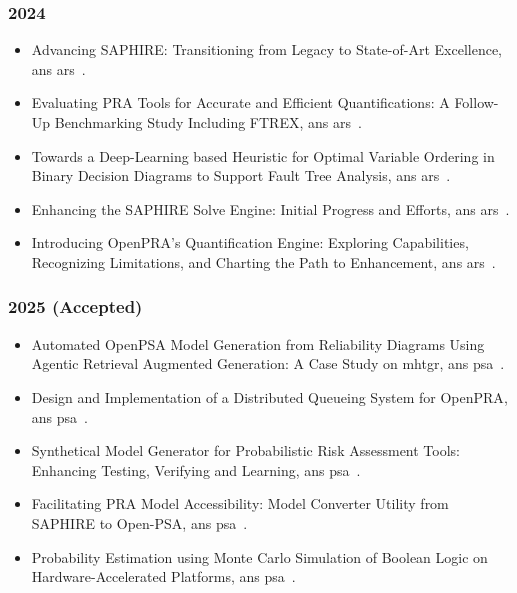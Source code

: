 \subsubsection*{2024}
\begin{itemize}
    \item {Advancing SAPHIRE: Transitioning from Legacy to State-of-Art Excellence}, \acrshort{ans} \acrfull{ars}~\cite{wood_advancing_2024}.
    \item {Evaluating PRA Tools for Accurate and Efficient Quantifications: A Follow-Up Benchmarking Study Including FTREX}, \acrshort{ans} \acrshort{ars}~\cite{farag_evaluating_2024}.
    \item {Towards a Deep-Learning based Heuristic for Optimal Variable Ordering in Binary Decision Diagrams to Support Fault Tree Analysis}, \acrshort{ans} \acrshort{ars}~\cite{earthperson_towards_2024}.
    \item {Enhancing the SAPHIRE Solve Engine: Initial Progress and Efforts}, \acrshort{ans} \acrshort{ars}~\cite{aras_enhancing_2024}.
    \item {Introducing OpenPRA's Quantification Engine: Exploring Capabilities, Recognizing Limitations, and Charting the Path to Enhancement}, \acrshort{ans} \acrshort{ars}~\cite{aras_introducing_2024}.
\end{itemize}

\subsubsection*{2025 (Accepted)}
\begin{itemize}
    \item {Automated OpenPSA Model Generation from Reliability Diagrams Using Agentic Retrieval Augmented Generation: A Case Study on \acrshort{mhtgr}}, \acrshort{ans} \acrshort{psa}~\cite{rasheeq_automated_2025}.
    \item {Design and Implementation of a Distributed Queueing System for OpenPRA}, \acrshort{ans} \acrshort{psa}~\cite{rasheeq_design_2025}.
    \item {Synthetical Model Generator for Probabilistic Risk Assessment Tools: Enhancing Testing, Verifying and Learning}, \acrshort{ans} \acrshort{psa}~\cite{aras_synthetical_2025}.
    \item {Facilitating PRA Model Accessibility: Model Converter Utility from SAPHIRE to Open-PSA}, \acrshort{ans} \acrshort{psa}~\cite{aras_facilitating_2025}.
    \item {Probability Estimation using Monte Carlo Simulation of Boolean Logic on Hardware-Accelerated Platforms}, \acrshort{ans} \acrshort{psa}~\cite{earthperson_probability_2025}.
\end{itemize}